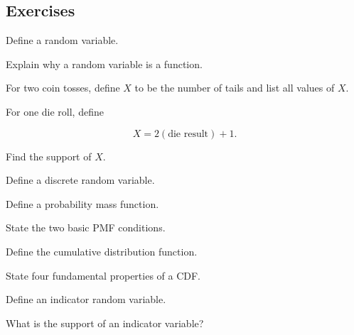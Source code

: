 \subsection{Exercises}
\label{subsec:random-variable-exercises}

\begin{exercise}[1]
Define a random variable.
\end{exercise}

\begin{exercise}[1]
Explain why a random variable is a function.
\end{exercise}

\begin{exercise}[1]
For two coin tosses, define \(X\) to be the number of tails and list all
values of \(X\).
\end{exercise}

\begin{exercise}[1]
For one die roll, define

\[
X=2(\text{die result})+1.
\]

Find the support of \(X\).
\end{exercise}

\begin{exercise}[1]
Define a discrete random variable.
\end{exercise}

\begin{exercise}[1]
Define a probability mass function.
\end{exercise}

\begin{exercise}[1]
State the two basic PMF conditions.
\end{exercise}

\begin{exercise}[1]
Define the cumulative distribution function.
\end{exercise}

\begin{exercise}[1]
State four fundamental properties of a CDF.
\end{exercise}

\begin{exercise}[1]
Define an indicator random variable.
\end{exercise}

\begin{exercise}[1]
What is the support of an indicator variable?
\end{exercise}

